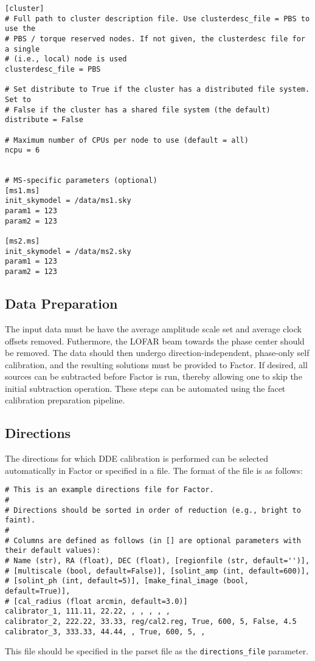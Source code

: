 \documentclass[structabstract]{article}
\begin{document}
\begin{verbatim}
[cluster]
# Full path to cluster description file. Use clusterdesc_file = PBS to use the
# PBS / torque reserved nodes. If not given, the clusterdesc file for a single
# (i.e., local) node is used
clusterdesc_file = PBS

# Set distribute to True if the cluster has a distributed file system. Set to
# False if the cluster has a shared file system (the default)
distribute = False

# Maximum number of CPUs per node to use (default = all)
ncpu = 6


# MS-specific parameters (optional)
[ms1.ms]
init_skymodel = /data/ms1.sky
param1 = 123
param2 = 123

[ms2.ms]
init_skymodel = /data/ms2.sky
param1 = 123
param2 = 123
\end{verbatim}


\subsection{Data Preparation}
\label{factor:data}

The input data must be have the average amplitude scale set and average clock
offsets removed. Futhermore, the LOFAR beam towards the phase center should be
removed. The data should then undergo direction-independent, phase-only self
calibration, and the resulting solutions must be provided to Factor. If desired,
all sources can be subtracted before Factor is run, thereby allowing one to skip
the initial subtraction operation. These steps can be automated using the facet
calibration preparation pipeline.

\subsection{Directions}
\label{factor:directions}

The directions for which DDE calibration is performed can be selected
automatically in Factor or specified in a file. The format of the file is as
follows:

\begin{verbatim}
# This is an example directions file for Factor.
#
# Directions should be sorted in order of reduction (e.g., bright to faint).
#
# Columns are defined as follows (in [] are optional parameters with their default values):
# Name (str), RA (float), DEC (float), [regionfile (str, default='')],
# [multiscale (bool, default=False)], [solint_amp (int, default=600)],
# [solint_ph (int, default=5)], [make_final_image (bool, default=True)],
# [cal_radius (float arcmin, default=3.0)]
calibrator_1, 111.11, 22.22, , , , , ,
calibrator_2, 222.22, 33.33, reg/cal2.reg, True, 600, 5, False, 4.5
calibrator_3, 333.33, 44.44, , True, 600, 5, ,
\end{verbatim}
This file should be specified in the parset file as the {\tt directions\_file}
parameter.
\end{document}
